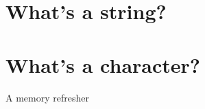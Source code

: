 \section{What's a string?}

\section{What's a character?}

\begin{frame}{A memory refresher}
\end{frame}
